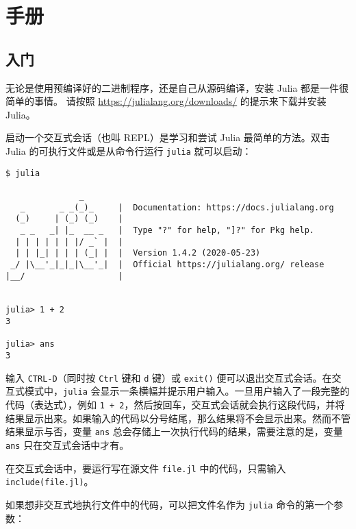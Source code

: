 
\part{手册}


\hypertarget{14943148626325101976}{}


\chapter{入门}



无论是使用预编译好的二进制程序，还是自己从源码编译，安装 Julia 都是一件很简单的事情。 请按照 \href{https://julialang.org/downloads/}{https://julialang.org/downloads/} 的提示来下载并安装 Julia。



启动一个交互式会话（也叫 REPL）是学习和尝试 Julia 最简单的方法。双击 Julia 的可执行文件或是从命令行运行 \texttt{julia} 就可以启动：




\begin{lstlisting}
$ julia

               _
   _       _ _(_)_     |  Documentation: https://docs.julialang.org
  (_)     | (_) (_)    |
   _ _   _| |_  __ _   |  Type "?" for help, "]?" for Pkg help.
  | | | | | | |/ _` |  |
  | | |_| | | | (_| |  |  Version 1.4.2 (2020-05-23)
 _/ |\__'_|_|_|\__'_|  |  Official https://julialang.org/ release
|__/                   |


julia> 1 + 2
3

julia> ans
3
\end{lstlisting}



输入 \texttt{CTRL-D}（同时按 \texttt{Ctrl} 键和 \texttt{d} 键）或 \texttt{exit()} 便可以退出交互式会话。在交互式模式中，\texttt{julia} 会显示一条横幅并提示用户输入。一旦用户输入了一段完整的代码（表达式），例如 \texttt{1 + 2}，然后按回车，交互式会话就会执行这段代码，并将结果显示出来。如果输入的代码以分号结尾，那么结果将不会显示出来。然而不管结果显示与否，变量 \texttt{ans} 总会存储上一次执行代码的结果，需要注意的是，变量 \texttt{ans} 只在交互式会话中才有。



在交互式会话中，要运行写在源文件 \texttt{file.jl} 中的代码，只需输入 \texttt{include({\textquotedbl}file.jl{\textquotedbl})}。



如果想非交互式地执行文件中的代码，可以把文件名作为 \texttt{julia} 命令的第一个参数：




